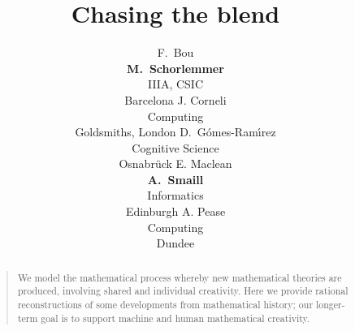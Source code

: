 \documentclass[letterpaper]{article}
\title{Chasing the blend}
\author{F.\ Bou \\ \Large{\textbf{M.\ Schorlemmer}}\\IIIA, CSIC \\ Barcelona
        \And J. Corneli \\Computing \\Goldsmiths, London
        \And D.\ G{\'o}mes-Ram{\'{\i}}rez\\Cognitive Science \\Osnabr{\"u}ck
        \And E. Maclean \\\Large{\textbf{A.\ Smaill}}\\ Informatics\\ Edinburgh
        \And A. Pease \\ Computing \\ Dundee}
\begin{document}
 
\maketitle
\begin{abstract}
\begin{quote}
We model the mathematical process whereby new mathematical
theories are produced, involving shared and individual creativity.
Here we provide rational reconstructions of some developments
from mathematical history;  our longer-term goal is to support
machine and human mathematical creativity.
\end{quote}
\end{abstract}









\nocite{Weil60}
\nocite{Boden90}
\nocite{nunez05}
\nocite{Lak00}
\nocite{Gog05,Gog99}

\printbibliography
\end{document}

